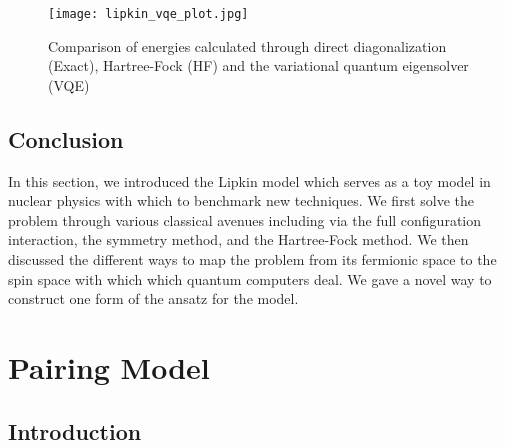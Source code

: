 \documentclass[Dual]{msu-thesis}
\begin{document}
\begin{figure}
    \centering
    \texttt{[image: lipkin\_vqe\_plot.jpg]}
    \caption{Comparison of energies calculated through direct diagonalization (Exact), Hartree-Fock (HF) and the variational quantum eigensolver (VQE)}
    \label{fig:lipkin_vqe_plot}
\end{figure}



\section{Conclusion} In this section, we introduced the Lipkin model which serves as a toy model in nuclear physics with which to benchmark new techniques. We first solve the problem through various classical avenues including via the full configuration interaction, the symmetry method, and the Hartree-Fock method. We then discussed the different ways to map the problem from its fermionic space to the spin space with which which quantum computers deal. We gave a novel way to construct one form of the ansatz for the model.

\chapter{Pairing Model}
\label{chap:pairing_model}

\section{Introduction}
\end{document}
